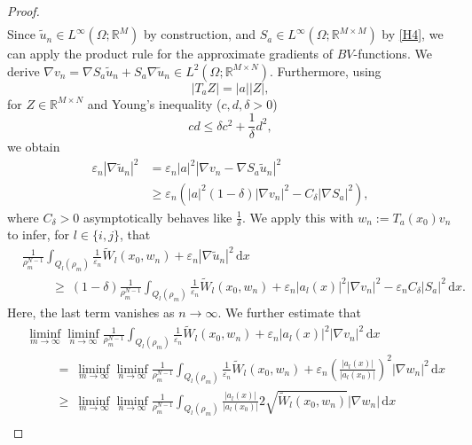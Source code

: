 \documentclass[a4paper, 11pt, reqno]{amsart}
\theoremstyle{plain}
\theoremstyle{definition}
\theoremstyle{remark}
\newcommand{\R}{\mathbb R}
\newcommand{\eps}{\varepsilon}
\begin{document}
\begin{proof}
\begin{align}
    \end{align}
    Since $\tilde u_n \in L^{\infty}(\Omega; \R^{M})$ by construction, and $S_a \in L^{\infty}(\Omega; \R^{M \times M})$ by \ref{H4}, we can apply the product rule for the approximate gradients of $BV$-functions. We derive $\nabla v_n = \nabla S_a \tilde u_n + S_a \nabla \tilde u_n \in L^2(\Omega; \R^{M \times N})$. Furthermore, using 
    \[
        |T_a Z| = |a||Z|,
    \]
    for $Z \in \R^{M \times N}$ and Young's inequality ($c,d,\delta > 0$)
    \[
        cd \leq \delta c^2 + \frac 1\delta d^2,
    \]
    we obtain
    \begin{align*}
        \eps_n |\nabla \tilde u_n|^2 &= \eps_n |a|^2|\nabla v_n - \nabla S_a \tilde u_n|^2 \\
        &\geq \eps_n(|a|^2(1 - \delta)|\nabla v_n|^2 - C_\delta|\nabla S_a |^2),
    \end{align*} 
    where $C_\delta > 0$ asymptotically behaves like $\frac1\delta$. We apply this with $w_n := T_a(x_0)v_n$ to infer, for $l \in \{i,j\}$, that 
    \begin{align}\label{eq:liminf_partial_inequality_4}
        &  \frac{1}{\rho_m^{N-1}}\int_{Q_l(\rho_m)} \frac{1}{\eps_n}{\widetilde W}_l(x_0, w_n) + \eps_n |\nabla \tilde u_n|^2 \, \mathrm{d}x  \nonumber \\
        & \hspace{1cm}\geq ~  (1-\delta) \frac{1}{\rho_m^{N-1}}\int_{Q_l(\rho_m)} \frac{1}{\eps_n}{{\widetilde W}_l}(x_0, w_n) + \eps_n |a_l(x)|^2|\nabla v_n|^2  - \eps_n C_\delta |S_a|^2 \, \mathrm{d}x.
    \end{align}
    Here, the last term vanishes as $n \to \infty$. We further estimate that
    \begin{align}\label{eq:liminf_partial_inequality_5}
        &\liminf_{m \to \infty} \liminf_{n \to \infty}\frac{1}{\rho_m^{N-1}}\int_{Q_l(\rho_m)} \frac{1}{\eps_n}{{\widetilde W}_l}(x_0, w_n) + \eps_n |a_l(x)|^2|\nabla v_n|^2 \, \mathrm{d}x \nonumber \\
        & \hspace{1cm} = ~ \liminf_{m \to \infty} \liminf_{n \to \infty} \frac{1}{\rho_m^{N-1}}\int_{Q_l(\rho_m)} \frac{1}{\eps_n}{\widetilde W}_l(x_0, w_n ) + \eps_n \left( \frac{|a_l(x)|}{|a_l(x_0)|} \right)^2|\nabla w_n|^2 \, \mathrm{d}x \nonumber\\
        & \hspace{1cm} \geq ~  \liminf_{m \to \infty} \liminf_{n \to \infty} \frac{1}{\rho_m^{N-1}}\int_{Q_l(\rho_m)}\frac{|a_l(x)|}{|a_l(x_0)|} 2\sqrt{{\widetilde W}_l(x_0, w_n)}|\nabla w_n| \, \mathrm{d}x  \nonumber \\

\end{align}
\end{proof}
\end{document}
